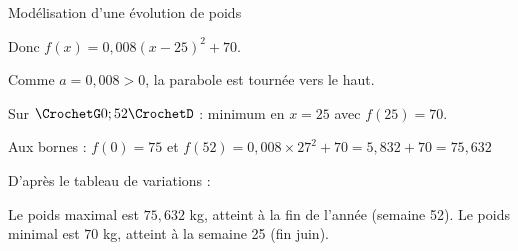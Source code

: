 \begin{EXO}{Modélisation d'une évolution de poids}{}
\begin{tcbenumerate}[2]
Donc $f(x) = 0{,}008(x-25)^2 + 70$.

Comme $a = 0{,}008 > 0$, la parabole est tournée vers le haut.

Sur $\CrochetG0;52\CrochetD$ : minimum en $x = 25$ avec $f(25) = 70$.

Aux bornes : $f(0) = 75$ et $f(52) = 0{,}008 \times 27^2 + 70 = 5{,}832 + 70 = 75{,}632$

\tcbitem D'après le tableau de variations :
\begin{tcbenumerate}[2]
\tcbitem Le poids maximal est $75{,}632$ kg, atteint à la fin de l'année (semaine 52).
\tcbitem Le poids minimal est $70$ kg, atteint à la semaine 25 (fin juin).
\end{tcbenumerate}
\end{tcbenumerate}
\end{EXO}